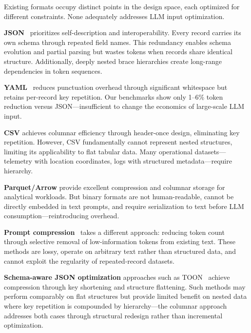\documentclass[10pt,twocolumn]{article}
\begin{document}
Existing formats occupy distinct points in the design space, each optimized for different constraints. None adequately addresses LLM input optimization.

\textbf{JSON}~\citep{rfc8259} prioritizes self-description and interoperability. Every record carries its own schema through repeated field names. This redundancy enables schema evolution and partial parsing but wastes tokens when records share identical structure. Additionally, deeply nested brace hierarchies create long-range dependencies in token sequences.

\textbf{YAML}~\citep{yaml12} reduces punctuation overhead through significant whitespace but retains per-record key repetition. Our benchmarks show only 1--6\% token reduction versus JSON---insufficient to change the economics of large-scale LLM input.

\textbf{CSV} achieves columnar efficiency through header-once design, eliminating key repetition. However, CSV fundamentally cannot represent nested structures, limiting its applicability to flat tabular data. Many operational datasets---telemetry with location coordinates, logs with structured metadata---require hierarchy.

\textbf{Parquet/Arrow} provide excellent compression and columnar storage for analytical workloads. But binary formats are not human-readable, cannot be directly embedded in text prompts, and require serialization to text before LLM consumption---reintroducing overhead.

\textbf{Prompt compression}~\citep{jiang2023llmlingua,pan2024llmlingua2} takes a different approach: reducing token count through selective removal of low-information tokens from existing text. These methods are lossy, operate on arbitrary text rather than structured data, and cannot exploit the regularity of repeated-record datasets.

\textbf{Schema-aware JSON optimization} approaches such as TOON~\citep{toon2024} achieve compression through key shortening and structure flattening. Such methods may perform comparably on flat structures but provide limited benefit on nested data where key repetition is compounded by hierarchy---the columnar approach addresses both cases through structural redesign rather than incremental optimization.
\end{document}
